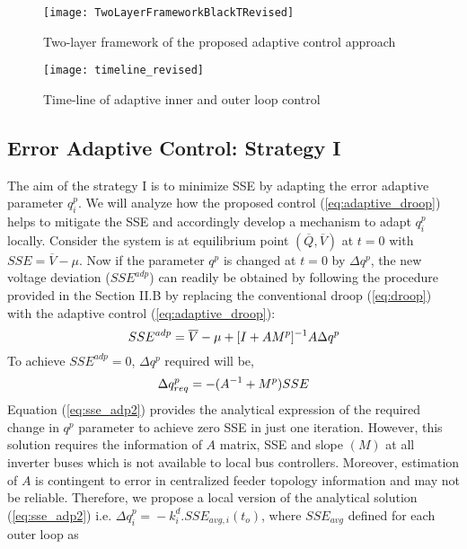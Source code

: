 \documentclass[journal]{IEEEtran}
\newcommand{\squeezeup}{\vspace{-2.5mm}}
\begin{document}
\begin{figure}[h]
	\centering
	\texttt{[image: TwoLayerFrameworkBlackTRevised]}
    \vspace{-1mm}
    \caption {Two-layer framework of the proposed adaptive control approach }
    \vspace{2mm}
    \label{fig:framework}
	\centering
	\texttt{[image: timeline\_revised]}
    \squeezeup
    \caption {Time-line of adaptive inner and outer loop control }
    \label{fig:timeline}
    \vspace{-3mm}
\end{figure}

\subsection{Error Adaptive Control: Strategy I}
The aim of the strategy I is to minimize SSE by adapting the error adaptive parameter $q_i^p$. We will analyze how the proposed control (\ref{eq:adaptive_droop}) helps to mitigate the SSE and accordingly develop a mechanism to adapt $q_i^p$ locally. Consider the system is at equilibrium point {\small$(\overline{Q},\overline{V})$} at $t=0$ with {\small $SSE=\overline{V}-\mu$}. Now if the parameter $q^p$ is changed at $t=0$ by $\Delta q^p$, the new voltage deviation ($SSE^{adp}$) can readily be obtained by following the procedure provided in the Section II.B  by replacing the conventional droop (\ref{eq:droop}) with the adaptive control (\ref{eq:adaptive_droop}):
\begin{equation}
\small
\label{eq:sse_adp}
SSE^{adp}=\overline{V}-\mu+[I+AM^p]^{-1}A\Delta q^p
\end{equation}
To achieve $SSE^{adp}=0$, $\Delta q^p$ required will be,
\begin{equation}
\small
\label{eq:sse_adp2}
\Delta q_{req}^p=-(A^{-1}+M^p)SSE
\end{equation}	
Equation (\ref{eq:sse_adp2}) provides the analytical expression of the required change in $q^p$ parameter to achieve zero SSE in just one iteration. However, this solution requires the information of $A$ matrix, SSE and slope $(M)$ at all inverter buses which is not available to local bus controllers. Moreover, estimation of $A$ is contingent to error in centralized feeder topology information and may not be reliable. Therefore, we propose a local version of the analytical solution (\ref{eq:sse_adp2}) i.e. {\small $\Delta q_i^p\!=\!-k_i^d.SSE_{avg,i}(t_o)$}, where {\small$SSE_{avg}$} defined for each outer loop as
\end{document}
